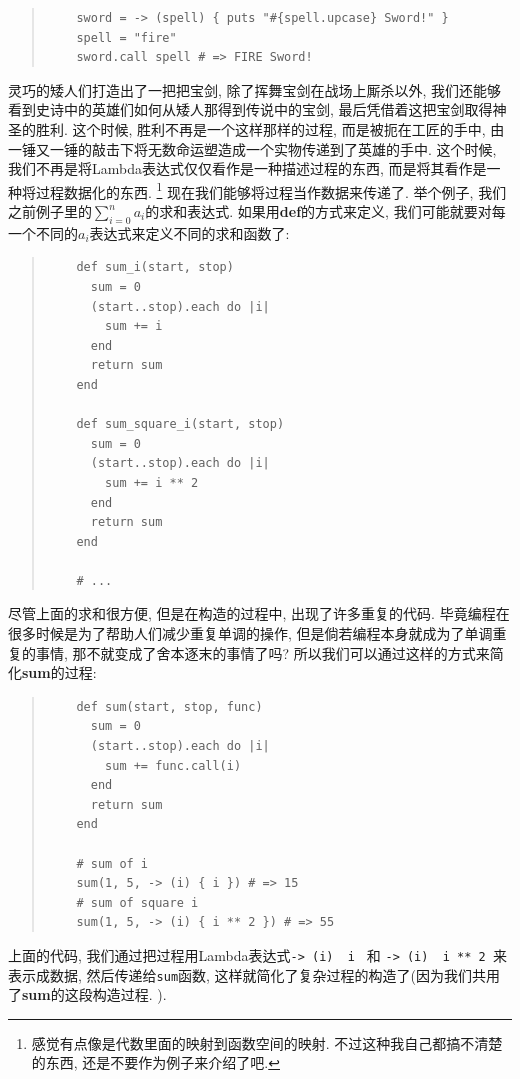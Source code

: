 \begin{quotation}
  \begin{verbatim}
    sword = -> (spell) { puts "#{spell.upcase} Sword!" }
    spell = "fire"
    sword.call spell # => FIRE Sword!
  \end{verbatim}
\end{quotation}

灵巧的矮人们打造出了一把把宝剑, 除了挥舞宝剑在战场上厮杀以外, 我们还能够看到史诗中的英雄们如何从矮人那得到传说中的宝剑, 最后凭借着这把宝剑取得神圣的胜利. 这个时候, 胜利不再是一个这样那样的过程, 而是被扼在工匠的手中, 由一锤又一锤的敲击下将无数命运塑造成一个实物传递到了英雄的手中. 这个时候, 我们不再是将Lambda表达式仅仅看作是一种描述过程的东西, 而是将其看作是一种将过程数据化的东西. \footnote{感觉有点像是代数里面的映射到函数空间的映射. 不过这种我自己都搞不清楚的东西, 还是不要作为例子来介绍了吧. } 现在我们能够将过程当作数据来传递了. 举个例子, 我们之前例子里的$\sum_{i=0}^n a_i$的求和表达式. 如果用\textbf{def}的方式来定义, 我们可能就要对每一个不同的$a_i$表达式来定义不同的求和函数了: 

\begin{quotation}
  \begin{verbatim}
    def sum_i(start, stop)
      sum = 0
      (start..stop).each do |i|
        sum += i
      end
      return sum
    end

    def sum_square_i(start, stop)
      sum = 0
      (start..stop).each do |i|
        sum += i ** 2
      end
      return sum
    end

    # ...
  \end{verbatim}
\end{quotation}

尽管上面的求和很方便, 但是在构造的过程中, 出现了许多重复的代码. 毕竟编程在很多时候是为了帮助人们减少重复单调的操作, 但是倘若编程本身就成为了单调重复的事情, 那不就变成了舍本逐末的事情了吗? 所以我们可以通过这样的方式来简化\textbf{sum}的过程: 

\begin{quotation}
  \begin{verbatim}
    def sum(start, stop, func)
      sum = 0
      (start..stop).each do |i|
        sum += func.call(i)
      end
      return sum
    end

    # sum of i
    sum(1, 5, -> (i) { i }) # => 15
    # sum of square i
    sum(1, 5, -> (i) { i ** 2 }) # => 55
  \end{verbatim}
\end{quotation}

上面的代码, 我们通过把过程用Lambda表达式\texttt{-> (i) { i }} 和 \texttt{-> (i) { i ** 2 }}来表示成数据, 然后传递给\texttt{sum}函数, 这样就简化了复杂过程的构造了(因为我们共用了\textbf{sum}的这段构造过程. ). 

